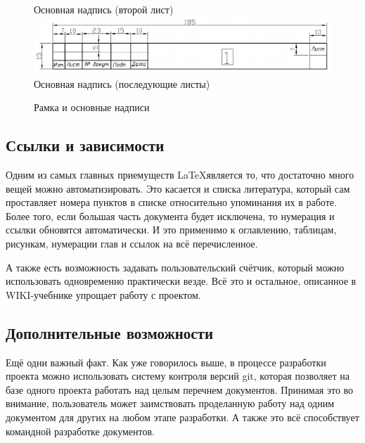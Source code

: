 \begin{figure}[!htb]
					Основная надпись (второй лист)
					\includegraphics[width=\linewidth]{src/images/frame3.png}
					Основная надпись (последующие листы)
				\endminipage
				\caption{Рамка и основные надписи}\label{img1}
			\end{figure}

	\newpage
	\subsection{Ссылки и зависимости} %
		Одним из самых главных приемуществ \LaTeX является то, что достаточно много вещей можно автоматизировать. Это касается и списка литература, который сам проставляет номера
		пунктов в списке относительно упоминания их в работе. Более того, если большая часть документа будет исключена, то нумерация и ссылки обновятся автоматически.
		И это применимо к оглавлению, таблицам, рисункам, нумерации глав и ссылок на всё перечисленное.

		А также есть возможность задавать пользовательский счётчик, который можно использовать одновременно практически везде. Всё это и остальное, описанное в WIKI-учебнике
		упрощает работу с проектом.
	\subsection{Дополнительные возможности}
		Ещё одни важный факт. Как уже говорилось выше, в процессе разработки проекта можно использовать систему контроля версий git, которая позволяет на базе одного проекта
		работать над целым перечнем документов. Принимая это во внимание, пользователь может заимствовать проделанную работу над одним документом для других на любом этапе разработки.
		А также это всё способствует командной разработке документов.
